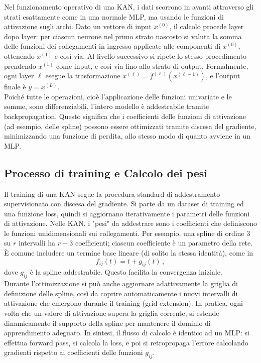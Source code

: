 \documentclass[a4paper,12pt]{report}
\begin{document}
	Nel funzionamento operativo di una KAN, i dati scorrono in avanti attraverso gli strati esattamente come in una normale MLP, ma usando le funzioni di attivazione sugli archi. Dato un vettore di input $x^{(0)}$, il calcolo procede layer dopo layer: per ciascun neurone nel primo strato nascosto si valuta la somma delle funzioni dei collegamenti in ingresso applicate alle componenti di $x^{(0)}$, ottenendo $x^{(1)}$ e così via. Al livello successivo si ripete lo stesso procedimento prendendo $x^{(1)}$ come input, e così via fino allo strato di output. Formalmente, ogni layer $\ell$ esegue la trasformazione $x^{(\ell)} = f^{(\ell)}(x^{(\ell-1)})$, e l’output finale è $y = x^{(L)}$. \\
	Poiché tutte le operazioni, cioè l’applicazione delle funzioni univariate e le somme, sono differenziabili, l'intero modello è addestrabile tramite backpropagation. Questo significa che i coefficienti delle funzioni di attivazione (ad esempio, delle spline) possono essere ottimizzati tramite discesa del gradiente, minimizzando una funzione di perdita, allo stesso modo di quanto avviene in un MLP.
	
	\subsection{Processo di training e Calcolo dei pesi}
	
	Il training di una KAN segue la procedura standard di addestramento supervisionato con discesa del gradiente. Si parte da un dataset di training ed una funzione loss, quindi si aggiornano iterativamente i parametri delle funzioni di attivazione. Nelle KAN, i "pesi" da addestrare sono i coefficienti che definiscono le funzioni unidimensionali sui collegamenti. Per esempio, una spline di ordine 3 su $r$ intervalli ha $r+3$ coefficienti; ciascun coefficiente è un parametro della rete. È comune includere un termine base lineare (di solito la stessa identità), come in 
	\[
	f_{ij}(t) = t + g_{ij}(t)\,, 
	\]
	dove $g_{ij}$ è la spline addestrabile. Questo facilita la convergenza iniziale. \\
	Durante l’ottimizzazione si può anche aggiornare adattivamente la griglia di definizione delle spline, così da coprire automaticamente i nuovi intervalli di attivazione che emergono durante il training (grid extension). In pratica, ogni volta che un valore di attivazione supera la griglia corrente, si estende dinamicamente il supporto della spline per mantenere il dominio di apprendimento adeguato. In sintesi, il flusso di calcolo è identico ad un MLP: si effettua forward pass, si calcola la loss, e poi si retropropaga l’errore calcolando gradienti rispetto ai coefficienti delle funzioni $g_{ij}$.
	
\end{document}
